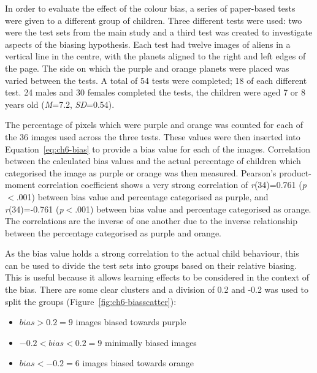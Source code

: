 In order to evaluate the effect of the colour bias, a series of paper-based tests were given to a different group of children. Three different tests were used: two were the test sets from the main study and a third test was created to investigate aspects of the biasing hypothesis. Each test had twelve images of aliens in a vertical line in the centre, with the planets aligned to the right and left edges of the page. The side on which the purple and orange planets were placed was varied between the tests. A total of 54 tests were completed; 18 of each different test. 24 males and 30 females completed the tests, the children were aged 7 or 8 years old (\textit{M}=7.2, \textit{SD}=0.54).

The percentage of pixels which were purple and orange was counted for each of the 36 images used across the three tests. These values were then inserted into Equation~\ref{eq:ch6-bias} to provide a bias value for each of the images. Correlation between the calculated bias values and the actual percentage of children which categorised the image as purple or orange was then measured. Pearson's product-moment correlation coefficient shows a very strong correlation of \textit{r}(34)=0.761 (\textit{p}$<$.001) between bias value and percentage categorised as purple, and \textit{r}(34)=-0.761 (\textit{p}$<$.001) between bias value and percentage categorised as orange. The correlations are the inverse of one another due to the inverse relationship between the percentage categorised as purple and orange.

As the bias value holds a strong correlation to the actual child behaviour, this can be used to divide the test sets into groups based on their relative biasing. This is useful because it allows learning effects to be considered in the context of the bias. There are some clear clusters and a division of 0.2 and -0.2 was used to split the groups (Figure~\ref{fig:ch6-biasscatter}):
\begin{itemize}
	\item $bias >  0.2 = 9$ images biased towards purple
	\item $-0.2 < bias < 0.2 = 9$ minimally biased images
	\item $bias < -0.2 = 6$ images biased towards orange
\end{itemize}

